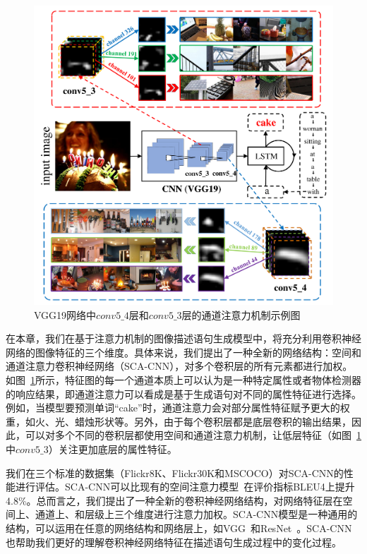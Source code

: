 \begin{figure}[htbp]
    \centering
    \includegraphics[width=0.8\linewidth]{chapter5/res/motivation.pdf}
    \caption{VGG19网络中$conv5\_4$层和$conv5\_3$层的通道注意力机制示例图}
    \label{ch5:fig:motivation}
\end{figure}



在本章，我们在基于注意力机制的图像描述语句生成模型中，将充分利用卷积神经网络的图像特征的三个维度。具体来说，我们提出了一种全新的网络结构：空间和通道注意力卷积神经网络（SCA-CNN），对多个卷积层的所有元素都进行加权。如图~\ref{ch5:fig:motivation}所示，特征图的每一个通道本质上可以认为是一种特定属性或者物体检测器的响应结果，即通道注意力可以看成是基于生成语句对不同的属性特征进行选择。例如，当模型要预测单词“cake”时，通道注意力会对部分属性特征赋予更大的权重，如火、光、蜡烛形状等。另外，由于每个卷积层都是底层卷积的输出结果，因此，可以对多个不同的卷积层都使用空间和通道注意力机制，让低层特征（如图~\ref{ch5:fig:motivation}中$conv5\_3$）关注更加底层的属性特征。

我们在三个标准的数据集（Flickr8K、Flickr30K和MSCOCO）对SCA-CNN的性能进行评估。SCA-CNN可以比现有的空间注意力模型~\cite{xu2015show}在评价指标BLEU4上提升4.8\%。总而言之，我们提出了一种全新的卷积神经网络结构，对网络特征层在空间上、通道上、和层级上三个维度进行注意力加权。SCA-CNN模型是一种通用的结构，可以运用在任意的网络结构和网络层上，如VGG~\cite{simonyan2015very}和ResNet~\cite{he2016deep}。SCA-CNN也帮助我们更好的理解卷积神经网络特征在描述语句生成过程中的变化过程。




